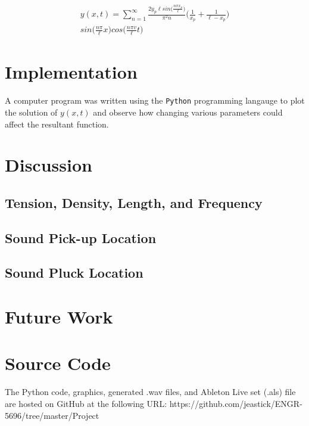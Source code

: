 \documentclass[%
 reprint,
 amsmath,amssymb,
 aps,
]{revtex4-1}
\begin{document}
\begin{multline}
y(x,t) =\sum_{n=1}^{\infty} \frac{2y_p\ell sin\Big(\frac{n \pi x_p}{\ell}\Big)}{\pi^2 n}\Big(\frac{1}{x_p} + \frac{1}{\ell-x_p}\Big) \\ sin\Big(\frac{n\pi}{\ell}x\Big)cos\Big(\frac{n\pi v}{\ell}t\Big) \label{yxtfinal}
\end{multline}

\section{\label{sec:level1}Implementation}

A computer program was written using the \texttt{Python} programming langauge to plot the solution of $y(x,t)$ and observe how changing various parameters could affect the resultant function.

\section{\label{sec:level1}Discussion}



\subsection{\label{sec:level1}Tension, Density, Length, and Frequency}



\subsection{\label{sec:level1}Sound Pick-up Location}


\subsection{\label{sec:level1}Sound Pluck Location}



\section{\label{sec:level1}Future Work}


\section{\label{sec:level1}Source Code}
The Python code, graphics, generated .wav files, and Ableton Live set (.als) file are hosted on GitHub at the following URL: 
https://github.com/jeastick/ENGR-5696/tree/master/Project
\end{document}
